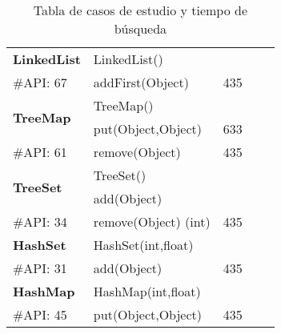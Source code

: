 \begin{table}[t!]
{\begin{tabular}{l l ccc}
\hline

\multirow{1}{*}{\textbf{LinkedList}} 
 & LinkedList() & \\
 {\scriptsize \#API: 67} & addFirst(Object) & 435 &&  \\
 \hline

\multirow{2}{*}{\textbf{TreeMap}} 
 & TreeMap() & \\
 & put(Object,Object) & 633 \\
{\scriptsize \#API: 61} & remove(Object)& 435 &&  \\
\hline

\multirow{2}{*}{\textbf{TreeSet}} 
 & TreeSet() & \\
 & add(Object) & \\
{\scriptsize \#API: 34} & remove(Object) (int) & 435 &&  \\
\hline

\multirow{1}{*}{\textbf{HashSet}} 
 & HashSet(int,float) & \\
 {\scriptsize \#API: 31} & add(Object) & 435 && \\
\hline

\multirow{1}{*}{\textbf{HashMap}} 
 & HashMap(int,float) & \\
{\scriptsize \#API: 45} & put(Object,Object) & 435 && \\
\hline

\end{tabular}%
}
\caption{Tabla de casos de estudio y tiempo de búsqueda}
\label{tab:EficienciaGA}
\end{table}

